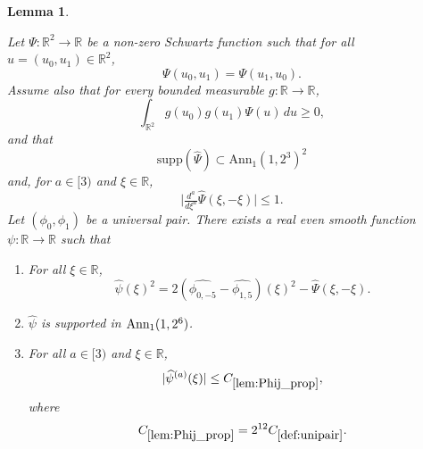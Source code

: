 \documentclass[12pt,reqno]{amsart}
\theoremstyle{plain}
\newtheorem{lemma}[theorem]{Lemma}
\numberwithin{equation}{section}
\theoremstyle{remark}
\newcommand{\uses}[1]{}
\newcommand{\usesdefs}[1]{}
\newcommand{\leanok}{}
\newcommand{\lean}[1]{}
\newcommand{\R}{{\mathbb R}}
\begin{document}
\begin{lemma}
\label{lem:Phij_prop}\uses{lem:Phipos_v2}\usesdefs{def:cn-window,def:unipair}
\lean{Auto.phiJProperties}
\leanok
Let $\Psi:\mathbb{R}^2\to\mathbb{R}$ be a non-zero Schwartz function such that for all $u=(u_0,u_1)\in\R^2$,
\begin{equation}\label{auto:Phij-symmetry-assumption}
\Psi(u_0,u_1)=\Psi(u_1,u_0).
\end{equation}
Assume also that for every bounded measurable $g:\R\to\R$,
\begin{equation}\label{auto:Phij-positivity-assumption}
\int_{\R^2}g(u_0)g(u_1)\Psi(u)\,du\ge0,
\end{equation}
and that
\begin{equation}\label{auto:Phij-Fourier-support-assumption}
\mathrm{supp}(\widehat{\Psi}) \subset \mathrm{Ann}_1(1, 2^3)^2
\end{equation}
and, for $a\in [3)$ and $\xi \in \R$,
\begin{equation}\label{Phij_psi_der}
\Big|\tfrac{d^a}{d\xi^{a}} \widehat{\Psi}(\xi,-\xi)\Big| \leq 1.
\end{equation}
Let $(\phi_0,\phi_1)$ be a universal pair. There exists a real even smooth function $\psi:\R\to \R$ such that
\begin{enumerate}
\item For all $\xi\in\R$,
\begin{equation}\label{Phij_psi_diag}
\widehat{\psi}(\xi)^2 = 2 (\widehat{\phi_{0,-5}}-\widehat{\phi_{1,5}})(\xi)^2 - \widehat{\Psi}(\xi,-\xi).
\end{equation}
\item $\widehat{\psi}$ is supported in $\textup{Ann}_1(1,2^6)$.
\item For all $a\in [3)$ and $\xi\in \R$,
\begin{equation}\label{psi_decay}
|\widehat{\psi}^{(a)}(\xi)|\le C_{\ref{lem:Phij_prop}},
\end{equation}
where
\begin{equation}\label{auto:Phij-constant-definition}
C_{\ref{lem:Phij_prop}}=2^{12}C_{\ref{def:unipair}}.
\end{equation}
\end{enumerate}
\end{lemma}
\end{document}
